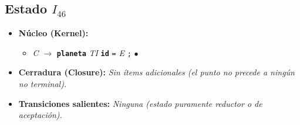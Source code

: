 \documentclass[12pt, letterpaper]{article}
\begin{document}
\subsection*{Estado $I_{46}$ }
\begin{itemize}\setlength{\itemsep}{1pt}\setlength{\parskip}{0pt}
\item \textbf{Núcleo (Kernel):}
\begin{itemize}\setlength{\itemsep}{1pt}\setlength{\parskip}{0pt}
    \item \textit{C} $\to$ \textbf{\texttt{planeta}} \textit{TI} \textbf{\texttt{id}} \texttt{=} \textit{E} \texttt{;} $\bullet$ 
\end{itemize}
\item \textbf{Cerradura (Closure):} \emph{Sin ítems adicionales (el punto no precede a ningún no terminal).}
\item \textbf{Transiciones salientes:} \emph{Ninguna (estado puramente reductor o de aceptación).}
\end{itemize}
\vspace{2pt}
\end{document}
